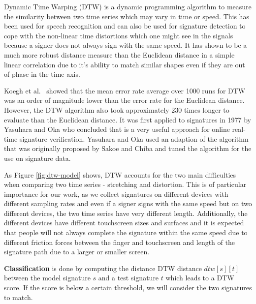 \documentclass[a4paper, oneside]{csthesis}
\begin{document}
Dynamic Time Warping (DTW) is a dynamic programming algorithm to measure the similarity between two time series which may vary in time or speed. This has been used for speech recognition and can also be used for signature detection to cope with the non-linear time distortions which one might see in the signals because a signer does not always sign with the same speed. It has shown to be a much more robust distance measure than the Euclidean distance in a simple linear correlation \cite{Keogh:2000:SUD:347090.347153, 1030918, 1227706} due to it's ability to match similar shapes even if they are out of phase in the time axis.

Koegh et al.~\cite{Keogh:2002:EID:1287369.1287405} showed that the mean error rate average over 1000 runs for DTW was an order of magnitude lower than the error rate for the Euclidean distance. However, the DTW algorithm also took approximately 230 times longer to evaluate than the Euclidean distance.
It was first applied to signatures in 1977 by Yasuhara and Oka \cite{yasuhara1977DTW} who concluded that is a very useful approach for online real-time signature verification. Yasuhara and Oka used an adaption of the algorithm that was originally proposed by Sakoe and Chiba \cite{1163055} and tuned the algorithm for the use on signature data.

As Figure \ref{fig:dtw-model} shows, DTW accounts for the two main difficulties when comparing two time series - stretching and distortion. This is of particular importance for our work, as we collect signatures on different devices with different sampling rates and even if a signer signs with the same speed but on two different devices, the two time series have very different length. Additionally, the different devices have different touchscreen sizes and surfaces and it is expected that people will not always complete the signature within the same speed due to different friction forces between the finger and touchscreen and length of the signature path due to a larger or smaller screen.



\textbf{Classification} is done by computing the distance DTW distance $dtw[s][t]$ between the model signature $s$ and a test signature $t$ which leads to a DTW score. If the score is below a certain threshold, we will consider the two signatures to match.
\end{document}
